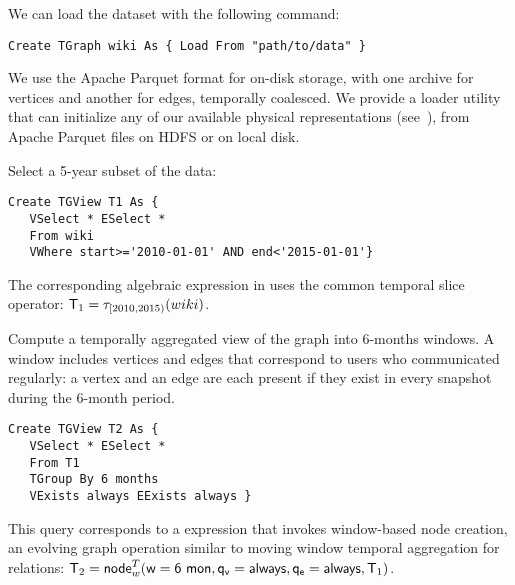 
\begin{example}
\label{ex:load}

We can load the dataset with the following command:

\begin{small} 
\begin{verbatim}
Create TGraph wiki As { Load From "path/to/data" }
\end{verbatim}
\end{small}

\end{example}

We use the Apache Parquet format for on-disk storage, with one archive
for vertices and another for edges, temporally coalesced.  We provide
a loader utility that can initialize any of our available physical
representations (see~\cite{PortalarXiv2016}), from Apache Parquet
files on HDFS or on local disk.

\begin{example}
\label{ex:slice}

Select a 5-year subset of the data:

\begin{small} 
\begin{verbatim}
Create TGView T1 As { 
   VSelect * ESelect *
   From wiki
   VWhere start>='2010-01-01' AND end<'2015-01-01'}
\end{verbatim}
\end{small}


The corresponding algebraic expression in \tra uses the common
temporal slice operator: $\mathsf{T}_1 = \tau_{[2010,2015)}(wiki)$.

\end{example}

\begin{example}
\label{ex:nodecrt}

Compute a temporally aggregated view of the graph into 6-months
windows.  A window includes vertices and edges that correspond to
users who communicated regularly: a vertex and an edge are each
present if they exist in every snapshot during the 6-month period.

\begin{small} 
\begin{verbatim}
Create TGView T2 As { 
   VSelect * ESelect *
   From T1
   TGroup By 6 months
   VExists always EExists always }
\end{verbatim}
\end{small}

This query corresponds to a \tra expression that invokes window-based
node creation, an evolving graph operation similar to moving window
temporal aggregation for relations:
$\mathsf{T}_2 = \textsf{node}^T_w(\mathsf{w=6~mon},\mathsf{q_v=always},\mathsf{q_e=always},\mathsf{T}_1)$.

\end{example}

